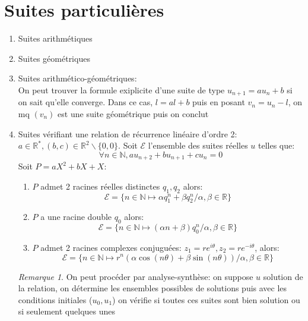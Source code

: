 \documentclass[fleqn]{article}
\theoremstyle{definition} \newtheorem*{defi}{D\'efinition}
\theoremstyle{definition} \newtheorem*{theo}{Th\'eor\`eme}
\theoremstyle{definition} \newtheorem*{prop}{Propri\'et\'e}
\theoremstyle{definition} \newtheorem*{coro}{Corollaire}
\theoremstyle{remark} \newtheorem*{rqs}{Remarque}
\begin{document}
\section{Suites particuli\`eres}
\begin{enumerate}
	\item Suites arithm\'etiques
	\item Suites g\'eom\'etriques
	\item Suites arithm\'etico-g\'eom\'etriques: \\
		On peut trouver la formule exiplicite d'une suite de type $u_{n+1} = au_n +b$ si on sait qu'elle converge. Dans ce cas, $l = al + b$
		puis en posant $v_n = u_n - l$, on mq $(v_n)$ est une suite g\'eom\'etrique puis on conclut
	\item Suites v\'erifiant une relation de r\'ecurrence lin\'eaire d'ordre 2: \\
		$a \in \mathbb{R}^*, (b,c) \in \mathbb{R}^2\backslash\{0,0\}$. Soit $\mathscr{E}$ l'ensemble des suites r\'eelles $u$ telles que:
		\[\forall n \in \mathbb{N}, au_{n+2} + bu_{n+1} + cu_n = 0\]
		Soit $P = aX^2 + bX + X$:
		\begin{enumerate}
			\item $P$ admet 2 racines r\'eelles distinctes $q_1, q_2$ alors:
				\[\mathscr{E} = \{n \in \mathbb{N} \mapsto \alpha q_1^n + \beta q_2^n / \alpha, \beta \in \mathbb{R}\}\]
			\item $P$ a une racine double $q_0$ alors:
				\[\mathscr{E} = \{n \in \mathbb{N} \mapsto (\alpha n + \beta) q_0^n / \alpha, \beta \in \mathbb{R}\}\]
			\item $P$ admet 2 racines complexes conjugu\'ees: $z_1 = re^{i\theta}, z_2 = re^{-i\theta}$, alors:
				\[\mathscr{E} = \{n \in \mathbb{N} \mapsto r^n(\alpha \cos(n\theta) + \beta \sin(n\theta)) / \alpha, \beta \in \mathbb{R}\}\]
		\end{enumerate}
		\begin{rqs}
			On peut proc\'eder par analyse-synth\`ese: on suppose $u$ solution de la relation, on d\'etermine les ensembles possibles de
			solutions puis avec les conditions initiales ($u_0, u_1$) on v\'erifie si toutes ces suites sont bien solution ou si seulement
			quelques unes
		\end{rqs}
\end{enumerate}
\end{document}
